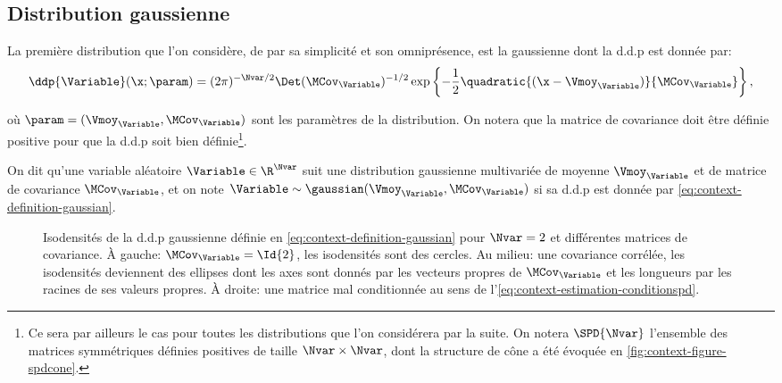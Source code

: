 \subsection{Distribution gaussienne}
\label{subsec:context-distributions-gaussian}

La première distribution que l'on considère, de par sa simplicité et son omniprésence, est la gaussienne dont la d.d.p est donnée par:
\begin{equation}
  \ddp{\Variable}(\x; \param) = (2\pi)^{-\Nvar/2}\Det(\MCov_\Variable)^{-1/2}\exp\left\{ -\frac{1}{2}\quadratic{(\x-\Vmoy_\Variable)}{\MCov_\Variable} \right\},
  \label{eq:context-definition-gaussian}
\end{equation}

où $\param = (\Vmoy_\Variable, \MCov_\Variable)$ sont les paramètres de la distribution. On notera que la matrice de covariance doit être définie positive pour que la d.d.p soit bien définie\footnote{Ce sera par ailleurs le cas pour toutes les distributions que l'on considérera par la suite. On notera $\SPD{\Nvar}$ l'ensemble des matrices symmétriques définies positives de taille $\Nvar\times\Nvar$, dont la structure de cône a été évoquée en \cref{fig:context-figure-spdcone}.}.

\begin{definition}
  On dit qu'une variable aléatoire $\Variable\in\R^\Nvar$ suit une distribution gaussienne multivariée de moyenne $\Vmoy_\Variable$ et de matrice de covariance $\MCov_\Variable$, et on note $\Variable\sim\gaussian(\Vmoy_\Variable, \MCov_\Variable)$ si sa d.d.p est donnée par \cref{eq:context-definition-gaussian}.
\end{definition}

\begin{figure}[h]
  \begin{center}
    
  \end{center}
  \provGaussisocontoursQR[.5cm]
  \caption{Isodensités de la d.d.p gaussienne définie en \cref{eq:context-definition-gaussian} pour $\Nvar=2$ et différentes matrices de covariance. À gauche: $\MCov_\Variable=\Id{2}$, les isodensités sont des cercles. Au milieu: une covariance corrélée, les isodensités deviennent des ellipses dont les axes sont donnés par les vecteurs propres de $\MCov_\Variable$ et les longueurs par les racines de ses valeurs propres. À droite: une matrice mal conditionnée au sens de l'\cref{eq:context-estimation-conditionspd}. \provGaussisocontours}
  \label{fig:context-distributions-gaussisocontours}
\end{figure}


